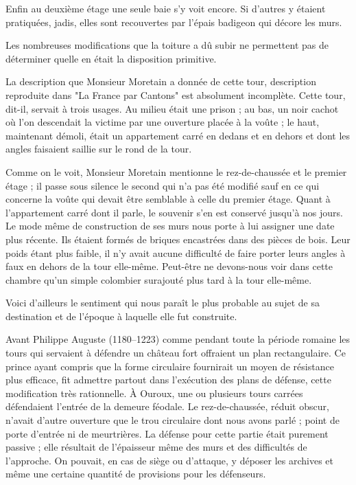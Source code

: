 Enfin au deuxième étage une seule baie s'y voit encore. Si d'autres y étaient pratiquées, jadis, elles sont recouvertes par l'épais badigeon qui décore les murs.

Les nombreuses modifications que la toiture a dû subir ne permettent pas de déterminer quelle en était la disposition primitive.

La description que Monsieur Moretain a donnée de cette tour, description reproduite dans "La France par Cantons" est absolument incomplète. Cette tour, dit-il, servait à trois usages. Au milieu était une prison ; au bas, un noir cachot où l'on descendait la victime
par une ouverture placée à la voûte ; le haut, maintenant démoli, était un appartement carré en dedans et en dehors et dont les angles faisaient saillie sur le rond de la tour.

Comme on le voit, Monsieur Moretain mentionne le rez-de-chaussée et le premier étage ; il passe sous silence le second qui n'a pas été modifié sauf en ce qui concerne la voûte qui devait être semblable à celle du premier étage. Quant à l'appartement carré dont il parle, le souvenir s'en est conservé jusqu'à nos jours. Le mode même de construction de ses murs nous porte à lui assigner une date plus récente. Ils étaient formés de briques encastrées dans des pièces de bois. Leur poids étant plus faible, il n'y avait aucune difficulté de faire porter leurs angles à faux en dehors de la tour elle-même. Peut-être ne devons-nous voir dans cette chambre qu'un simple colombier surajouté plus tard à la tour elle-même.

Voici d'ailleurs le sentiment qui nous paraît le plus probable au sujet de sa destination et de l'époque à laquelle elle fut construite.

Avant Philippe Auguste (1180--1223) comme pendant toute la période romaine les tours qui servaient à défendre un château fort offraient un plan rectangulaire. Ce prince ayant compris que la forme circulaire fournirait un moyen de résistance plus efficace, fit admettre partout dans l'exécution des plans de défense, cette modification très rationnelle. À Ouroux, une ou plusieurs tours carrées défendaient l'entrée de la demeure féodale. Le rez-de-chaussée, réduit obscur, n'avait d'autre ouverture que le trou circulaire dont nous avons parlé ; point de porte d'entrée ni de meurtrières. La défense pour cette partie était purement passive ; elle résultait de l'épaisseur même des murs et des difficultés de l'approche. On pouvait, en cas de siège ou d'attaque, y déposer les archives et même une certaine quantité de provisions pour les défenseurs.

